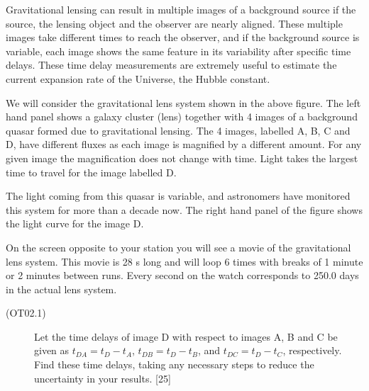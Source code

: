 Gravitational lensing can result in multiple images of a background source
if the source, the lensing object and the observer are nearly aligned. These
multiple images take different times to reach the observer, and if the
background source is variable, each image shows the same feature in its
variability after specific time delays. These time delay measurements are
extremely useful to estimate the current expansion rate of the Universe, the
Hubble constant.

We will consider the gravitational lens system shown in the above figure.
The left hand panel shows a galaxy cluster (lens) together with 4 images of
a background quasar formed due to gravitational lensing. The 4 images,
labelled A, B, C and D, have different fluxes as each image is magnified by
a different amount. For any given image the magnification does not change
with time. Light takes the largest time to travel for the image labelled D.


The light coming from this quasar is variable, and astronomers have
monitored this system for more than a decade now. The right hand panel of
the figure shows the light curve for the image D.

On the screen opposite to your station you will see a movie of the
gravitational lens system. This movie is 28 s long and will loop 6 times
with breaks of 1 minute or 2 minutes between runs. Every second on the watch
corresponds to 250.0 days in the actual lens system.

\begin{description}
\item[(OT02.1)] Let the time delays of image D with respect to images A, B
  and C be given as $t_{DA} = t_D - t_A$, $t_{DB} = t_D - t_B$, and
  $t_{DC} = t_D - t_C$, respectively. Find these time delays, taking any
  necessary steps to reduce the uncertainty in your results. \hfill[25]
\end{description}
